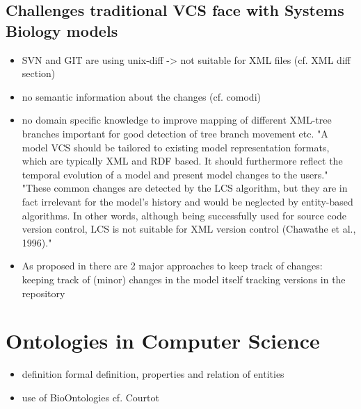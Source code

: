 	\subsection{Challenges traditional VCS face with Systems Biology models}
	\begin{itemize}
		\item SVN and GIT are using unix-diff -> not suitable for XML files (cf. XML diff section)
		\item no semantic information about the changes (cf. comodi)
		\item no domain specific knowledge to improve mapping of different XML-tree branches
			\subitem important for good detection of tree branch movement etc. 
			\subitem "A model VCS should be tailored to existing model representation formats, which are typically XML and RDF based. It should furthermore reflect the temporal evolution of a model and present model changes to the users." \cite{Waltemath2013}
			\subitem "These
			common changes are detected by the LCS algorithm, but they are in fact irrelevant for the model’s history and would be neglected by entity-based algorithms. In other words, although being successfully used for source code version control, LCS is not suitable for XML version control (Chawathe et al., 1996)." \cite{Waltemath2013}
		\item As proposed in \cite{Waltemath2013} there are 2 major approaches to keep track of changes:
			\subitem keeping track of (minor) changes in the model itself
			\subitem tracking versions in the repository
	\end{itemize}


\section{Ontologies in Computer Science}

	\begin{itemize}
	\item definition
		\subitem formal definition, properties and relation of entities
	\item use of BioOntologies cf. Courtot
	\end{itemize}

	

